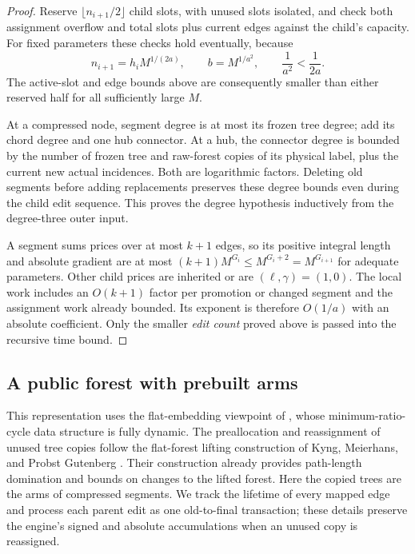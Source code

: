 \begin{proof}
Reserve $\lfloor n_{i+1}/2\rfloor$ child slots, with unused slots
isolated, and check both assignment overflow and total slots plus
current edges against the child's capacity.  For fixed parameters
these checks hold eventually, because
\begin{equation}
 n_{i+1}=h_iM^{1/(2a)},\qquad
 b=M^{1/a^2},\qquad \frac1{a^2}<\frac1{2a}.
 \label{update:child-slack}
\end{equation}
The active-slot and edge bounds above are consequently smaller than
either reserved half for all sufficiently large $M$.

At a compressed node, segment degree is at most its frozen tree
degree; add its chord degree and one hub connector.  At a hub, the
connector degree is bounded by the number of frozen tree and
raw-forest copies of its physical label, plus the current new actual
incidences.  Both are logarithmic factors.  Deleting old segments
before adding replacements preserves these degree bounds even
during the child edit sequence.  This proves the degree hypothesis
inductively from the degree-three outer input.

A segment sums prices over at most $k+1$ edges, so its positive
integral length and absolute gradient are at most
$(k+1)M^{G_i}\le M^{G_i+2}=M^{G_{i+1}}$ for adequate parameters.
Other child prices are inherited or are $(\ell,\gamma)=(1,0)$.
The local work includes an $O(k+1)$ factor per promotion or changed
segment and the assignment work already bounded.  Its exponent is
therefore $O(1/a)$ with an absolute coefficient.  Only the smaller
\emph{edit count} proved above is passed into the recursive time
bound.
\end{proof}

\subsection{A public forest with prebuilt arms}

This representation uses the flat-embedding viewpoint of
\cite[Definition~2.3 and Theorem~3.5]{IncrementalGraphs}, whose
minimum-ratio-cycle data structure is fully dynamic.
The preallocation and reassignment of unused tree copies follow the
flat-forest lifting construction of Kyng, Meierhans, and Probst Gutenberg
\cite[Section~3.3, Lemma~3.21 and Algorithm~5]
{KyngMeierhansProbstGutenberg2023FlatForest}.  Their construction already
provides path-length domination and bounds on changes to the lifted
forest.  Here the copied trees are the arms of compressed segments.
We track the lifetime of every mapped edge and process each parent edit
as one old-to-final transaction; these details preserve the engine's
signed and absolute accumulations when an unused copy is reassigned.

